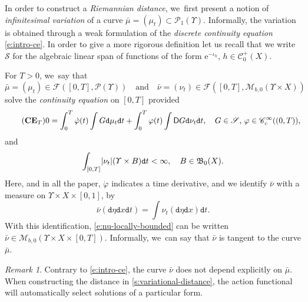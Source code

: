 \documentclass[JEP,XML,SOM,Unicode,published]{cedram}
\theoremstyle{definition}
\theoremstyle{remark}
\newtheorem{remark}[theorem]{Remark}
\DeclarePairedDelimiter{\abs}{\lvert}{\rvert}
\begin{document}
In order to construct a \emph{Riemannian distance}, we~first present a notion of \emph{infinitesimal variation} of a curve $\bar{\mu} = (\mu_{t}) \subset \mathscr{P}_{1}(\varUpsilon)$.
Informally, the variation is obtained through a weak formulation of the \emph{discrete continuity equation} \cref{e:intro-ce}.
In order to give a more rigorous definition let us recall that we write $\mathscr{S}$ for the algebraic linear span of functions of the form $\mathrm{e}^{-\iota_{h}}$, $h \in \mathscr{C}_{0}^{+}(X)$.

For $T > 0$, we~say that
\[
\bar{\mu} = (\mu_{t}) \in \mathscr{F}([0,T],\mathscr{P}(\varUpsilon))\quad\text{and}\quad \bar{\nu} = (\nu_{t}) \in \mathscr{F}([0,T], \mathscr{M}_{b,0}(\varUpsilon \times X))
\]
solve the \emph{continuity equation} on $[0,T]$ provided
\begin{equation}\label{e:ce}\tag{$\mathbf{CE}_{T}$}
0 = \int_{0}^{T} \dot{\varphi}(t) \int G \mathtt{d} \mu_{t} \mathtt{d} t + \int_{0}^{T} \varphi(t) \int \mathsf{D} G \mathtt{d} \nu_{t} \mathtt{d} t, \quad G \in \mathscr{S},\, \varphi \in \mathscr{C}_{c}^{\infty}((0,T)),
\end{equation}
and
\begin{equation}\label{e:nu-locally-bounded}
\int_{[0,T]} \abs{\nu_{t}}(\varUpsilon \times B) \mathtt{d} t < \infty, \quad B \in \mathfrak{B}_{0}(X).
\end{equation}
Here, and in all the paper, $\dot{\varphi}$ indicates a time derivative, and we identify $\bar{\nu}$ with a measure on $\varUpsilon \times X \times [0,1]$, by
\begin{equation*}
\bar{\nu}(\mathtt{d} \eta \mathtt{d} x \mathtt{d} t) = \int \nu_{t}(\mathtt{d} \eta \mathtt{d} x) \mathtt{d} t.
\end{equation*}
With this identification, \cref{e:nu-locally-bounded} can be written $\bar{\nu} \in \mathscr{M}_{b,0}(\varUpsilon \times X \times [0,T])$.
Informally, we~can say that $\bar{\nu}$ is tangent to the curve $\bar{\mu}$.

\begin{remark}
Contrary to \cref{e:intro-ce}, the curve $\bar{\nu}$ does not depend explicitly on $\bar{\mu}$.
When constructing the distance in \cref{s:variational-distance}, the action functional will automatically select solutions of a particular form.
\end{remark}
\end{document}
